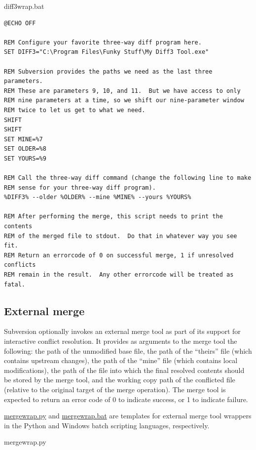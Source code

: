 \protect{}\label{svn.advanced.externaldifftools.diff3.ex-2}
diff3wrap.bat

\begin{verbatim}
@ECHO OFF

REM Configure your favorite three-way diff program here.
SET DIFF3="C:\Program Files\Funky Stuff\My Diff3 Tool.exe"

REM Subversion provides the paths we need as the last three parameters.
REM These are parameters 9, 10, and 11.  But we have access to only
REM nine parameters at a time, so we shift our nine-parameter window
REM twice to let us get to what we need.
SHIFT
SHIFT
SET MINE=%7
SET OLDER=%8
SET YOURS=%9

REM Call the three-way diff command (change the following line to make
REM sense for your three-way diff program).
%DIFF3% --older %OLDER% --mine %MINE% --yours %YOURS%

REM After performing the merge, this script needs to print the contents
REM of the merged file to stdout.  Do that in whatever way you see fit.
REM Return an errorcode of 0 on successful merge, 1 if unresolved conflicts
REM remain in the result.  Any other errorcode will be treated as fatal.
\end{verbatim}

\subsection{External merge}\label{svn.advanced.externaldifftools.merge}

Subversion optionally invokes an external merge tool as part of its
support for interactive conflict resolution. It provides as arguments to
the merge tool the following: the path of the unmodified base file, the
path of the ``theirs'' file (which contains upstream changes), the path
of the ``mine'' file (which contains local modifications), the path of
the file into which the final resolved contents should be stored by the
merge tool, and the working copy path of the conflicted file (relative
to the original target of the merge operation). The merge tool is
expected to return an error code of 0 to indicate success, or 1 to
indicate failure.

\hyperref[svn.advanced.externaldifftools.merge.ex-1]{mergewrap.py} and
\hyperref[svn.advanced.externaldifftools.merge.ex-2]{mergewrap.bat} are
templates for external merge tool wrappers in the Python and Windows
batch scripting languages, respectively.

\protect{}\label{svn.advanced.externaldifftools.merge.ex-1}
mergewrap.py

